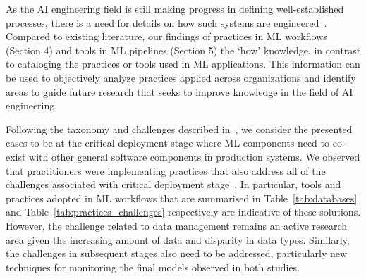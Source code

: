 




As the AI engineering field is still making progress in defining well-established processes, there is a need for details on how such systems are engineered~\cite{9121629}. Compared to existing literature, our findings of practices in ML workflows (Section 4) and tools in ML pipelines (Section 5) \DIFdelbegin {}\DIFdelend \DIFaddbegin {}\DIFaddend the ‘how’ knowledge, in contrast to cataloging the practices or tools used in ML applications. This information can be used to objectively analyze practices applied across organizations and identify areas to guide future research \DIFaddbegin {}\DIFaddend that seeks to improve knowledge in the field of AI engineering.

Following the taxonomy and challenges described in~\cite{Lwakatare2019}, we consider the presented cases to be at the critical deployment stage where ML components need to co-exist with other general software components in production systems. We observed that practitioners were implementing practices that also address all of the challenges associated with \DIFdelbegin {}\DIFdelend \DIFaddbegin {}\DIFaddend critical deployment stage~\cite{Lwakatare2019}. In particular, tools and practices adopted in ML workflows that are summarised in Table~\ref{tab:databases} and Table~\ref{tab:practices_challenges} respectively are indicative of these solutions. However, the challenge related to data management remains an active research area given the increasing amount of data and disparity in data types. Similarly, the challenges in subsequent stages also need to be addressed, particularly new techniques for monitoring the final models observed in both studies.


